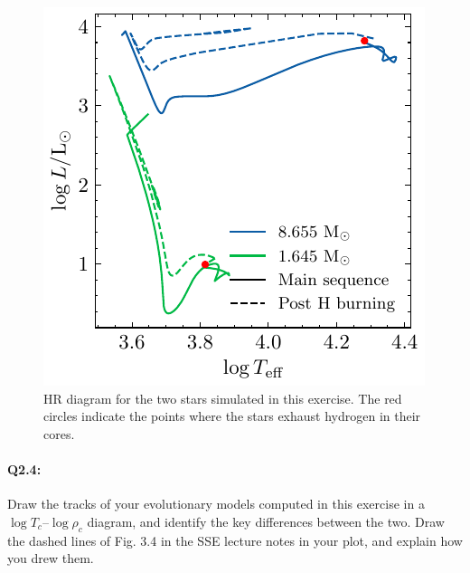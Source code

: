 \documentclass[twocolumn,fontsize=11pt]{scrartcl}
\begin{document}
\begin{figure}[htbp]
    \centering
    \includegraphics{q23_H_burning.pdf}
    \caption{HR diagram for the two stars simulated in this exercise. The red circles indicate the points where the stars exhaust hydrogen in their cores.}
    \label{fig:q23_H_burning}
\end{figure} 

\paragraph{Q2.4:} Draw the tracks of your evolutionary models computed in this exercise in a \(\log T_c\)–\(\log \rho_c\) diagram, and identify the key differences between the two. Draw the dashed lines of Fig. 3.4 in the SSE lecture notes in your plot, and explain how you drew them.
\end{document}
